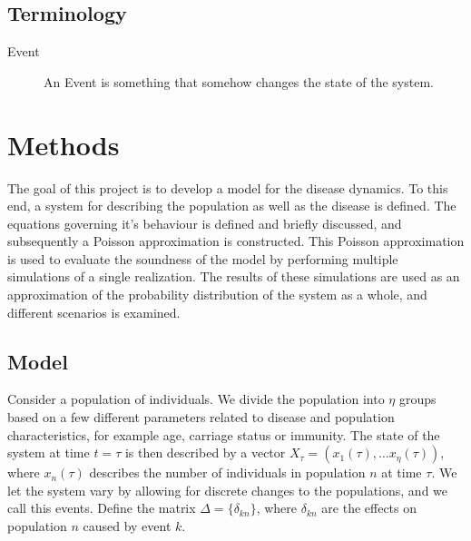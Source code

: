 \documentclass[10pt,a4paper]{article}
\begin{document}

\subsection{Terminology}

\begin{description}
	\item[Event] An Event is something that somehow changes the state of the system.
\end{description}

\section{Methods}

The goal of this project is to develop a model for the disease dynamics. To this end, a system for describing the population as well as the disease is defined. The equations governing it's behaviour is defined and briefly discussed, and subsequently a Poisson approximation is constructed. This Poisson approximation is used to evaluate the soundness of the model by performing multiple simulations of a single realization. The results of these simulations are used as an approximation of the probability distribution of the system as a whole, and different scenarios is examined.

\subsection{Model}

Consider a population of individuals. We divide the population into $\eta$ groups based on a few different parameters related to disease and population characteristics, for example age, carriage status or immunity. The state of the system at time $t = \tau$ is then described by a vector $X_\tau = \left( x_1 \left( \tau \right), \ldots x_\eta\left( \tau \right) \right)$, where $x_n\left( \tau \right)$ describes the number of individuals in population $n$ at time $\tau$. We let the system vary by allowing for discrete changes to the populations, and we call this events. Define the matrix $\Delta = \{ \delta_{kn} \}$, where $\delta_{kn}$ are the effects on population $n$ caused by event $k$.
\end{document}
